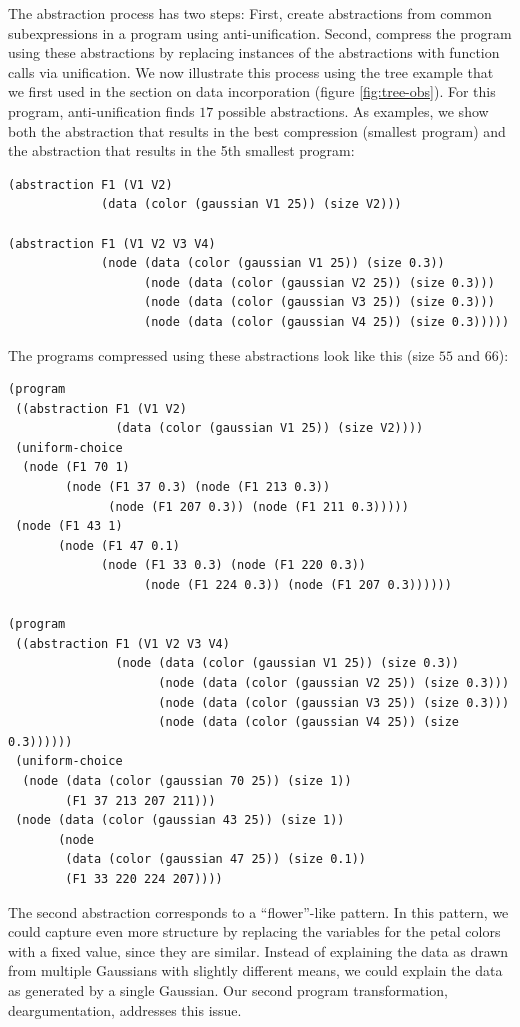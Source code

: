 \documentclass[a4paper,10pt]{article}
\begin{document}
The abstraction process has two steps: First, create abstractions from common subexpressions in a program using anti-unification. Second, compress the program using these abstractions by replacing instances of the abstractions with function calls via unification.
We now illustrate this process using the tree example that we first used in the section on data incorporation (figure \ref{fig:tree-obs}).
For this program, anti-unification finds $17$ possible abstractions. As examples, we show both the abstraction that results in the best compression (smallest program) and the abstraction that results in the 5th smallest program:
\begin{lstlisting}
(abstraction F1 (V1 V2)
             (data (color (gaussian V1 25)) (size V2)))

(abstraction F1 (V1 V2 V3 V4)
             (node (data (color (gaussian V1 25)) (size 0.3))
                   (node (data (color (gaussian V2 25)) (size 0.3)))
                   (node (data (color (gaussian V3 25)) (size 0.3)))
                   (node (data (color (gaussian V4 25)) (size 0.3)))))
\end{lstlisting}
The programs compressed using these abstractions look like this (size $55$ and $66$):
\begin{lstlisting}
(program
 ((abstraction F1 (V1 V2)
               (data (color (gaussian V1 25)) (size V2))))
 (uniform-choice
  (node (F1 70 1)
        (node (F1 37 0.3) (node (F1 213 0.3))
              (node (F1 207 0.3)) (node (F1 211 0.3)))))
 (node (F1 43 1)
       (node (F1 47 0.1)
             (node (F1 33 0.3) (node (F1 220 0.3))
                   (node (F1 224 0.3)) (node (F1 207 0.3))))))

(program
 ((abstraction F1 (V1 V2 V3 V4)
               (node (data (color (gaussian V1 25)) (size 0.3))
                     (node (data (color (gaussian V2 25)) (size 0.3)))
                     (node (data (color (gaussian V3 25)) (size 0.3)))
                     (node (data (color (gaussian V4 25)) (size 0.3))))))
 (uniform-choice
  (node (data (color (gaussian 70 25)) (size 1))
        (F1 37 213 207 211)))
 (node (data (color (gaussian 43 25)) (size 1))
       (node
        (data (color (gaussian 47 25)) (size 0.1))
        (F1 33 220 224 207))))
\end{lstlisting}
The second abstraction corresponds to a ``flower''-like pattern. In this pattern, we could capture even more structure by replacing the variables for the petal colors with a fixed value, since they are similar. Instead of explaining the data as drawn from multiple Gaussians with slightly different means, we could explain the data as generated by a single Gaussian. Our second program transformation, deargumentation, addresses this issue.
\end{document}
